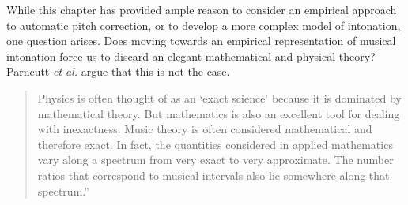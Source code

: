 While this chapter has provided ample reason to consider an empirical approach to automatic pitch correction, or to develop a more complex model of intonation, one question arises. Does moving towards an empirical representation of musical intonation force us to discard an elegant mathematical and physical theory? Parncutt \textit{et al.} argue that this is not the case. 
\begin{quotation}Physics is often thought of as an `exact science' because it is dominated by mathematical theory. But mathematics is also an excellent tool for dealing with inexactness. Music theory is often considered mathematical and therefore exact. In fact, the quantities considered in applied mathematics vary along a spectrum from very exact to very approximate. The number ratios that correspond to musical intervals also lie somewhere along that spectrum.''
\end{quotation}



